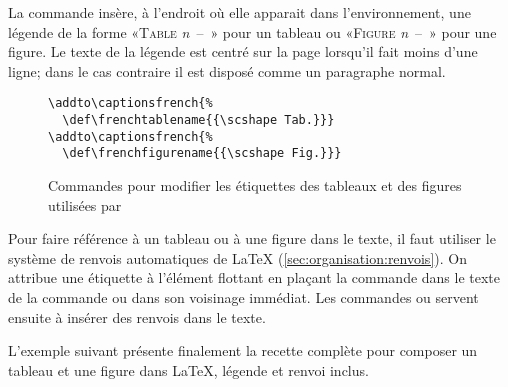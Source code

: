 La commande \cmd{\caption} insère,  à l'endroit où elle
apparait dans l'environnement, une légende de la forme «\textsc{Table}
\emph{n}~--~» pour un tableau ou «\textsc{Figure}
\emph{n}~--~» pour une figure. Le texte de la légende est
centré sur la page lorsqu'il fait moins d'une ligne; dans le cas
contraire il est disposé comme un paragraphe normal.


\begin{figure}
\begin{lstlisting}
\addto\captionsfrench{%
  \def\frenchtablename{{\scshape Tab.}}}
\addto\captionsfrench{%
  \def\frenchfigurename{{\scshape Fig.}}}
\end{lstlisting}
  \caption{Commandes pour modifier les étiquettes des tableaux et des
    figures utilisées par }
  \label{fig:tableaux+figures:captionsfrench}
\end{figure}

Pour faire référence à un tableau ou à une figure dans le texte, il
faut utiliser le système de renvois automatiques de {\LaTeX}
(\autoref{sec:organisation:renvois}). On attribue une étiquette à l'élément
flottant en plaçant la commande \cmd{\label} dans le texte de la
commande \cmd{\caption} ou dans son voisinage immédiat. Les commandes
\cmd{\ref} ou \cmd{\autoref} servent ensuite à insérer des renvois dans
le texte.

L'exemple suivant présente finalement la recette complète pour composer
un tableau et une figure dans {\LaTeX}, légende et renvoi inclus.


